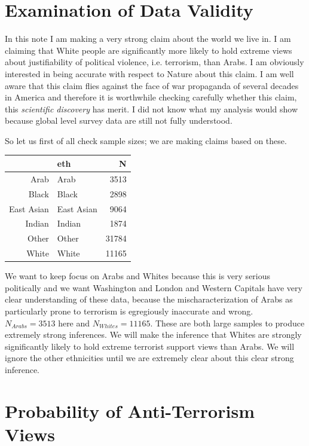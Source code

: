 \documentclass{amsart}
\begin{document}
\section{Examination of Data Validity}

In this note I am making a very strong claim about the world we live in.  I am claiming that White people are significantly more likely to hold extreme views about justifiability of political violence, i.e. terrorism, than Arabs.  I am obviously interested in being accurate with respect to Nature about this claim.  I am well aware that this claim flies against the face of war propaganda of several decades in America and therefore it is worthwhile checking carefully whether this claim, this {\em scientific discovery} has merit.  I did not know what my analysis would show because global level survey data are still not fully understood.  

So let us first of all check sample sizes; we are making claims based on these.

\begin{table}[ht]
\centering
\begin{tabular}{rlr}
  \hline
 & eth & N \\ 
  \hline
Arab & Arab & 3513 \\ 
  Black & Black & 2898 \\ 
  East Asian & East Asian & 9064 \\ 
  Indian & Indian & 1874 \\ 
  Other & Other & 31784 \\ 
  White & White & 11165 \\ 
   \hline
\end{tabular}
\end{table}

We want to keep focus on Arabs and Whites because this is very serious politically and we want Washington and London and Western Capitals have very clear understanding of these data, because the mischaracterization of Arabs as particularly prone to terrorism is egregiously inaccurate and wrong.  $N_{Arabs}=3513$ here and $N_{Whites}=11165$.  These are both large samples to produce extremely strong inferences.  We will make the inference that Whites are strongly significantly likely to hold extreme terrorist support views than Arabs.  We will ignore the other ethnicities until we are extremely clear about this clear strong inference.


\section{Probability of Anti-Terrorism Views}
\end{document}
